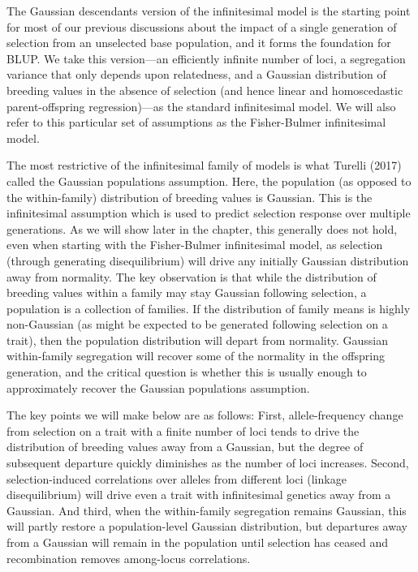 \documentclass{article}
\begin{document}
The Gaussian descendants version of the infinitesimal model is the starting point for most of our previous discussions about the impact of a single generation of selection from an unselected base population, and it forms the foundation for BLUP. We take this version—an efficiently infinite number of loci, a segregation variance that only depends upon relatedness, and a Gaussian distribution of breeding values in the absence of selection (and hence linear and homoscedastic parent-offspring regression)—as the standard infinitesimal model. We will also refer to this particular set of assumptions as the Fisher-Bulmer infinitesimal model.

The most restrictive of the infinitesimal family of models is what Turelli (2017) called the Gaussian populations assumption. Here, the population (as opposed to the within-family) distribution of breeding values is Gaussian. This is the infinitesimal assumption which is used to predict selection response over multiple generations. As we will show later in the chapter, this generally does not hold, even when starting with the Fisher-Bulmer infinitesimal model, as selection (through generating disequilibrium) will drive any initially Gaussian distribution away from normality. The key observation is that while the distribution of breeding values within a family may stay Gaussian following selection, a population is a collection of families. If the distribution of family means is highly non-Gaussian (as might be expected to be generated following selection on a trait), then the population distribution will depart from normality. Gaussian within-family segregation will recover some of the normality in the offspring generation, and the critical question is whether this is usually enough to approximately recover the Gaussian populations assumption.

The key points we will make below are as follows: First, allele-frequency change from selection on a trait with a finite number of loci tends to drive the distribution of breeding values away from a Gaussian, but the degree of subsequent departure quickly diminishes as the number of loci increases. Second, selection-induced correlations over alleles from different loci (linkage disequilibrium) will drive even a trait with infinitesimal genetics away from a Gaussian. And third, when the within-family segregation remains Gaussian, this will partly restore a population-level Gaussian distribution, but departures away from a Gaussian will remain in the population until selection has ceased and recombination removes among-locus correlations.
\end{document}
